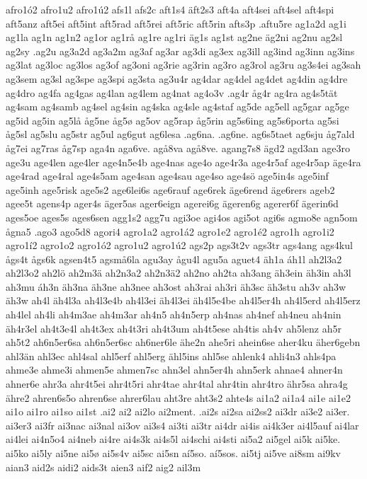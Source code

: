 afro1ó2
afro1u2
afro1ú2
afs1l
afs2c
aft1s4
äft2s3
aft4a
aft4sei
aft4sel
aft4spi
aft5anz
aft5ei
aft5int
aft5rad
aft5rei
aft5ric
aft5rin
afts3p
.aftu5re
ag1a2d
ag1i
ag1la
ag1n
ag1n2
ag1or
ag1rå
ag1re
ag1ri
äg1s
ag1st
ag2ne
äg2ni
ag2nu
ag2sl
ag2sy
.ag2u
ag3a2d
ag3a2m
ag3af
ag3ar
ag3di
ag3ex
ag3ill
ag3ind
ag3inn
ag3ins
ag3lat
ag3loc
ag3los
ag3of
ag3oni
ag3rie
ag3rin
ag3ro
ag3rol
ag3ru
ag3s4ei
ag3sah
ag3sem
ag3sl
ag3spe
ag3spi
ag3sta
ag3u4r
ag4dar
ag4del
ag4det
ag4din
ag4dre
ag4dro
ag4fa
ag4gas
ag4lan
ag4lem
ag4nat
ag4o3v
.ag4r
åg4r
ag4ra
ag4s5tät
ag4sam
ag4samb
ag4sel
ag4sin
ag4ska
ag4sle
ag4staf
ag5de
ag5ell
ag5gar
ag5ge
ag5id
ag5in
ag5lå
åg5ne
åg5ø
ag5ov
ag5rap
åg5rin
ag5s6ing
ag5s6porta
ag5si
åg5sl
ag5slu
ag5str
ag5ul
ag6gut
ag6lesa
.ag6na.
.ag6ne.
ag6s5taet
ag6sju
åg7ald
åg7ei
ag7ras
åg7sp
aga4n
aga6ve.
agå8va
agå8ve.
agang7s8
ägd2
agd3an
age3ro
age3u
age4len
age4ler
age4n5e4b
age4nas
age4o
age4r3a
age4r5af
age4r5ap
äge4ra
age4rad
age4ral
age4s5am
age4san
age4sau
age4so
age4sö
age5in4s
age5inf
age5inh
age5risk
age5s2
age6lei6s
age6rauf
age6rek
äge6rend
äge6rers
ageb2
agee5t
agens4p
ager4s
äger5as
ager6eign
agerei6g
ägeren6g
agerer6f
ägerin6d
ages5oe
ages5s
ages6sen
agg1s2
agg7u
agi3oe
agi4os
agi5ot
agi6s
agmo8e
agn5om
ågna5
.ago3
ago5d8
agori4
agro1a2
agro1á2
agro1e2
agro1é2
agro1h
agro1i2
agro1í2
agro1o2
agro1ó2
agro1u2
agro1ú2
ags2p
ags3t2v
ags3tr
ags4ang
ags4kul
ågs4t
ågs6k
agsen4t5
agsmå6la
agu3ay
ågu4l
agu5a
aguet4
äh1a
áh1l
ah2l3a2
ah2l3o2
ah2lö
ah2m3ä
ah2n3a2
ah2n3ä2
ah2no
ah2ta
ah3ang
äh3ein
äh3in
ah3l
ah3mu
áh3n
äh3na
äh3ne
ah3nee
ah3ost
ah3rai
ah3ri
äh3sc
äh3stu
ah3v
ah3w
äh3w
ah4l
äh4l3a
ah4l3e4b
ah4l3ei
äh4l3ei
äh4l5e4be
ah4l5er4h
ah4l5erd
ah4l5erz
ah4lel
ah4li
ah4m3ae
ah4m3ar
ah4n5
ah4n5erp
ah4nas
ah4nef
ah4neu
ah4nin
äh4r3el
ah4t3e4l
ah4t3ex
ah4t3ri
ah4t3um
ah4t5ese
ah4tis
ah4v
ah5lenz
ah5r
ah5t2
ah6n5er6sa
ah6n5er6sc
ah6ner6le
ähe2n
ahe5ri
ahein6se
aher4ku
äher6gebn
ahl3än
ahl3ec
ahl4sal
ahl5erf
ahl5erg
ähl5ins
ahl5se
ahlenk4
ahli4n3
ahls4pa
ahme3e
ahme3i
ahmen5e
ahmen7sc
ahn3el
ahn5er4h
ahn5erk
ahnae4
ahner4n
ahner6e
ahr3a
ahr4t5ei
ahr4t5ri
ahr4tae
ahr4tal
ahr4tin
ahr4tro
ähr5sa
ahra4g
ähre2
ahren6s5o
ahren6se
ahrer6lau
aht3re
aht3s2
ahte4s
ai1a2
ai1a4
ai1e
ai1e2
ai1o
ai1ro
ai1so
ai1st
.ai2
ai2
ai2lo
ai2ment.
.ai2s
ai2sa
ai2ss2
ai3dr
ai3e2
ai3er.
ai3er3
ai3fr
ai3nac
ai3nal
ai3ov
ai3s4
ai3ti
ai3tr
ai4dr
ai4is
ai4k3er
ai4l5auf
ai4lar
ai4lei
ai4n5o4
ai4neb
ai4re
ai4s3k
ai4s5l
ai4schi
ai4sti
ai5a2
ai5gel
ai5k
ai5ke.
ai5ko
ai5ly
ai5ne
ai5ø
ai5s4v
ai5sc
ai5sn
aí5so.
aí5sos.
ai5tj
ai5ve
ai8sm
ai9kv
aian3
aid2s
aidi2
aids3t
aien3
aif2
aig2
ail3m
